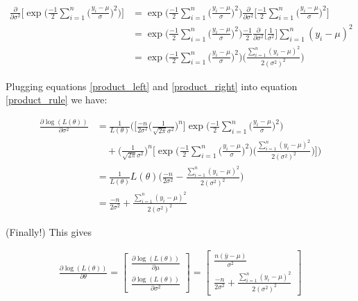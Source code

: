 \begin{align}
    \label{product_right}
    \frac{\partial}{\partial \sigma^2}\Big[\exp\Big(\frac{-1}{2}\sum_{i=1}^n \Big(\frac{y_i - \mu}{\sigma}\Big)^2 \Big)\Big]
    &= \exp\Big(\frac{-1}{2}\sum_{i=1}^n \Big(\frac{y_i - \mu}{\sigma}\Big)^2 \Big)
    \frac{\partial}{\partial \sigma^2}\Big[\frac{-1}{2}\sum_{i=1}^n \Big(\frac{y_i - \mu}{\sigma}\Big)^2 \Big]\nonumber\\
    &=\exp\Big(\frac{-1}{2}\sum_{i=1}^n \Big(\frac{y_i - \mu}{\sigma}\Big)^2 \Big)
    \frac{-1}{2}\frac{\partial}{\partial \sigma^2}\Big[\frac{1}{\sigma^2}\Big]\sum_{i=1}^n (y_i - \mu)^2 \nonumber\\
    &=\exp\Big(\frac{-1}{2}\sum_{i=1}^n \Big(\frac{y_i - \mu}{\sigma}\Big)^2 \Big)
    \Big(\frac{\sum_{i=1}^n (y_i - \mu)^2 }{2(\sigma^2)^2}\Big)
\end{align}

Plugging equations \ref{product_left} and \ref{product_right} into equation \ref{product_rule} we have:

\begin{align}
    \frac{\partial \log(L(\theta))}{\partial \sigma^2} 
    &= \frac{1}{L(\theta)}\Big(\Big[\frac{-n}{2\sigma^2}\Big(\frac{1}{\sqrt{2\pi}\sigma^2}\Big)^{n}\Big]
    \exp\Big(\frac{-1}{2}\sum_{i=1}^n \Big(\frac{y_i - \mu}{\sigma}\Big)^2 \Big) \nonumber\nonumber\\
    &\quad+
    \Big(\frac{1}{\sqrt{2\pi}\sigma^2}\Big)^n 
    \Big[\exp\Big(\frac{-1}{2}\sum_{i=1}^n \Big(\frac{y_i - \mu}{\sigma}\Big)^2 \Big)
\Big(\frac{\sum_{i=1}^n (y_i - \mu)^2 }{2(\sigma^2)^2}\Big)\Big]\Big)\nonumber\\
    &=\frac{1}{L(\theta)} L(\theta)\Big(\frac{-n}{2\sigma^2} -\frac{\sum_{i=1}^n (y_i - \mu)^2 }{2(\sigma^2)^2}\Big)\nonumber\\
    &=\frac{-n}{2\sigma^2} +\frac{\sum_{i=1}^n (y_i - \mu)^2 }{2(\sigma^2)^2}
\end{align}

(Finally!) This gives

\begin{align*}
    \frac{\partial \log(L(\theta))}{\partial \theta} = 
    \begin{bmatrix}
        \frac{\partial \log(L(\theta))}{\partial \mu} \\ 
        \frac{\partial \log(L(\theta))}{\partial \sigma^2}
    \end{bmatrix}
    =
    \begin{bmatrix}
        \frac{n(\bar{y}-\mu)}{\sigma^2} \\
        \frac{-n}{2\sigma^2} +\frac{\sum_{i=1}^n (y_i - \mu)^2 }{2(\sigma^2)^2}
    \end{bmatrix}
\end{align*}

